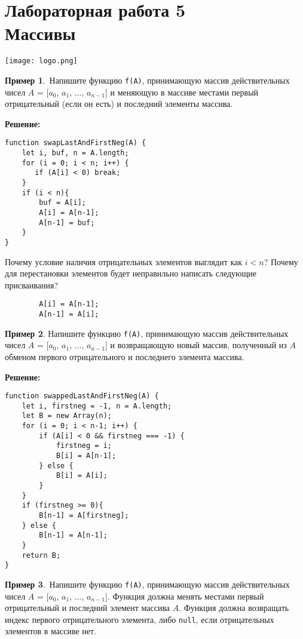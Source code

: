 \documentclass{article}
\begin{document}
\section*{{\normalsize Лабораторная работа 5} \\ Массивы}

\noindent\vskip-18mm
\null\hfill\texttt{[image: logo.png]}
\newline


{\bf Пример 1}.~Напишите функцию \texttt{f(A)}, принимающую массив действительных чисел $A$ = [$a_0$, $a_1$, $\ldots$, $a_{n-1}$] и меняющую в массиве местами первый отрицательный (если он есть) и последний элементы массива.

\smallskip\noindent\textbf{Решение:}

\begin{verbatim}
function swapLastAndFirstNeg(A) {
    let i, buf, n = A.length;
    for (i = 0; i < n; i++) {
       if (A[i] < 0) break;
    }
    if (i < n){
        buf = A[i];
        A[i] = A[n-1];
        A[n-1] = buf;
    }
}
\end{verbatim}

\noindent Почему условие наличия отрицательных элементов выглядит как $i<n$? Почему для перестановки элементов будет неправильно написать следующие присваивания?
\begin{verbatim}
        A[i] = A[n-1]; 
        A[n-1] = A[i];
\end{verbatim}


{\bf Пример 2}. Напишите функцию \texttt{f(A)}, принимающую массив действительных чисел $A$ = [$a_0$, $a_1$, $\ldots$, $a_{n-1}$] и возвращающую новый массив, полученный из $A$ обменом первого отрицательного и последнего элемента массива.

\smallskip\noindent\textbf{Решение:}
\begin{verbatim}
function swappedLastAndFirstNeg(A) {
    let i, firstneg = -1, n = A.length;
    let B = new Array(n);
    for (i = 0; i < n-1; i++) {
        if (A[i] < 0 && firstneg === -1) {
            firstneg = i;
            B[i] = A[n-1];
        } else {
            B[i] = A[i];
        }
    }
    if (firstneg >= 0){
        B[n-1] = A[firstneg];
    } else {
        B[n-1] = A[n-1];
    }
    return B;
}
\end{verbatim}


{\bf Пример 3}.~Напишите функцию \texttt{f(A)}, принимающую массив действительных чисел $A$ = [$a_0$, $a_1$, $\ldots$, $a_{n-1}$]. Функция должна менять местами первый отрицательный и последний элемент массива $A$. Функция должна возвращать индекс первого отрицательного элемента, либо \texttt{null}, если отрицательных элементов в массиве нет. 
\end{document}
